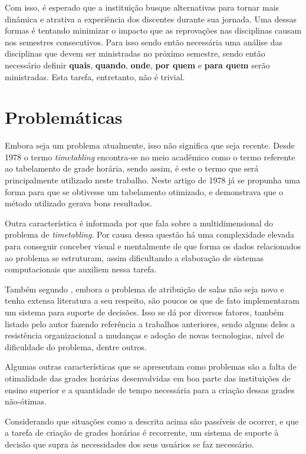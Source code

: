 Com isso, é esperado que a instituição busque alternativas para tornar mais dinâmica e atrativa a experiência dos discentes durante sua jornada. Uma dessas formas é tentando minimizar o impacto que as reprovações nas disciplinas causam nos semestres consecutivos. Para isso sendo então necessária uma análise das disciplinas que devem ser ministradas no próximo semestre, sendo então necessário definir \textbf{quais}, \textbf{quando}, \textbf{onde}, \textbf{por quem} e \textbf{para quem} serão ministradas. Esta tarefa, entretanto, não é trivial.

\section{Problemáticas} %

Embora seja um problema atualmente, isso não significa que seja recente. Desde 1978 \cite{BARHAM1978} o termo \textit{timetabling} encontra-se no meio acadêmico como o termo referente ao tabelamento de grade horária, sendo assim, é este o termo que será principalmente utilizado neste trabalho. Neste artigo de 1978 já se propunha uma forma para que se obtivesse um tabelamento otimizado, e demonstrava que o método utilizado gerava bons resultados.

Outra característica é informada por  que fala sobre a multidimensional do problema de \textit{timetabling}. Por causa dessa questão há uma complexidade elevada para conseguir conceber visual e mentalmente de que forma os dados relacionados ao problema se estruturam, assim dificultando a elaboração de sistemas computacionais que auxiliem nessa tarefa.

Também segundo , embora o problema de atribuição de salas não seja novo e tenha extensa literatura a seu respeito, são poucos os que de fato implementaram um sistema para suporte de decisões. Isso se dá por diversos fatores, também listado pelo autor fazendo referência a trabalhos anteriores, sendo alguns deles a resistência organizacional a mudanças e adoção de novas tecnologias, nível de dificuldade do problema, dentre outros.

Algumas outras características que se apresentam como problemas são a falta de otimalidade das grades horárias desenvolvidas em boa parte das instituições de ensino superior e a quantidade de tempo necessária para a criação dessas grades não-ótimas.

Considerando que situações como a descrita acima são passíveis de ocorrer, e que a tarefa de criação de grades horárias é recorrente, um sistema de suporte à decisão que supra às necessidades dos seus usuários se faz necessário.

